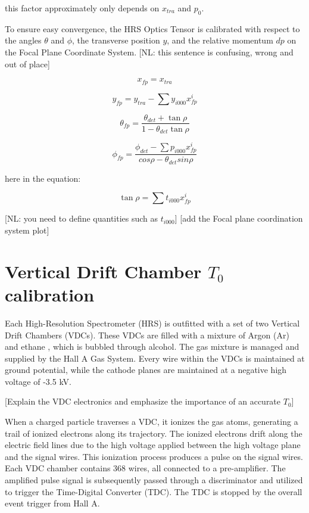 this factor approximately only depends on $x_{tra}$ and $p_0$.

To ensure easy convergence, the HRS Optics Tensor is calibrated with respect to the angles $\theta$ and $\phi$, the transverse  position $y$, and the relative momentum $dp$ on the Focal Plane Coordinate System.
[NL: this sentence is confusing, wrong and out of place]

\begin{equation}
    x_{fp} = x_{tra}    \label{eq:cpt3_fps_1}
\end{equation}

\begin{equation}
    y_{fp} = y_{tra} - \sum y_{i000}x^i_{fp}  
\end{equation}

\begin{equation}
\theta_{fp} = \frac{\theta_{det} + \tan\rho}{1 - \theta_{det}\tan\rho}
\end{equation}


\begin{equation}
    \phi_{fp} = \frac{\phi_{det} - \sum p_{i000}x^i_{fp}}{cos \rho - \theta_{det} sin\rho}
\end{equation}

here  in the equation:

\begin{equation}
    \tan\rho  = \sum t_{i000}x^i_{fp} \label{eq:cpt3_fps_5}
\end{equation}

[NL: you need to define quantities such as $t_{i000}$]
[add the Focal plane coordination system plot]


\section{Vertical Drift Chamber $T_0$ calibration}

Each High-Resolution Spectrometer (HRS) is outfitted with a set of two Vertical Drift Chambers (VDCs). These VDCs are filled with a mixture of Argon (Ar) and ethane , which is bubbled through alcohol. The gas mixture is managed and supplied by the Hall A Gas System. Every wire within the VDCs is maintained at  ground potential, while the cathode planes are maintained at a negative  high voltage of  -3.5 kV.

[Explain the VDC electronics and emphasize the importance of an accurate $T_0$]

When a charged particle traverses a VDC, it ionizes the gas atoms, generating a trail of ionized electrons along its trajectory. The ionized electrons drift along the electric field lines due to the high voltage applied between the high voltage plane and the signal wires. This ionization process produces a pulse on the signal wires. Each VDC chamber contains 368 wires, all connected to a pre-amplifier. The amplified pulse signal is subsequently passed through a discriminator and utilized to trigger the Time-Digital Converter (TDC). The TDC is stopped by the overall event trigger from Hall A.


